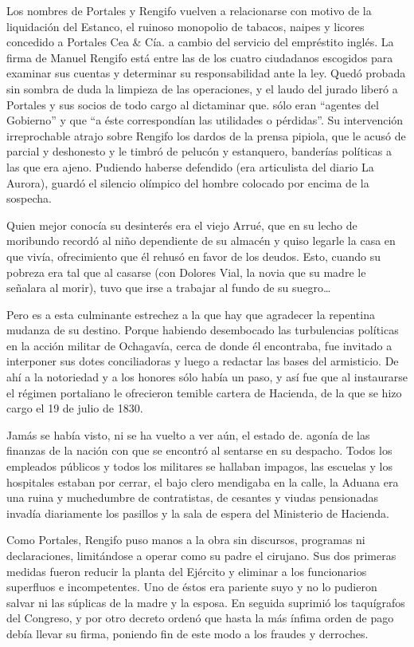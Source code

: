 \documentclass[10pt,twoside,openright]{memoir}
\begin{document}
Los nombres de Portales y Rengifo vuelven a relacionarse con motivo de
la liquidación del Estanco, el ruinoso monopolio de tabacos, naipes y
licores concedido a Portales Cea \& Cía. a cambio del servicio del
empréstito inglés. La firma de Manuel Rengifo está entre las de los
cuatro ciudadanos escogidos para examinar sus cuentas y determinar su
responsabilidad ante la ley. Quedó probada sin sombra de duda la
limpieza de las operaciones, y el laudo del jurado liberó a Portales y
sus socios de todo cargo al dictaminar que. sólo eran ``agentes del
Gobierno'' y que ``a éste correspondían las utilidades o pérdidas''. Su
intervención irreprochable atrajo sobre Rengifo los dardos de la prensa
pipiola, que le acusó de parcial y deshonesto y le timbró de pelucón y
estanquero, banderías políticas a las que era ajeno. Pudiendo haberse
defendido (era articulista del diario La Aurora), guardó el silencio
olímpico del hombre colocado por encima de la sospecha.

Quien mejor conocía su desinterés era el viejo Arrué, que en su lecho de
moribundo recordó al niño dependiente de su almacén y quiso legarle la
casa en que vivía, ofrecimiento que él rehusó en favor de los deudos.
Esto, cuando su pobreza era tal que al casarse (con Dolores Vial, la
novia que su madre le señalara al morir), tuvo que irse a trabajar al
fundo de su suegro\ldots

Pero es a esta culminante estrechez a la que hay que agradecer la
repentina mudanza de su destino. Porque habiendo desembocado las
turbulencias políticas en la acción militar de Ochagavía, cerca de donde
él encontraba, fue invitado a interponer sus dotes conciliadoras y luego
a redactar las bases del armisticio. De ahí a la notoriedad y a los
honores sólo había un paso, y así fue que al instaurarse el régimen
portaliano le ofrecieron temible cartera de Hacienda, de la que se hizo
cargo el 19 de julio de 1830.

Jamás se había visto, ni se ha vuelto a ver aún, el estado de. agonía de
las finanzas de la nación con que se encontró al sentarse en su
despacho. Todos los empleados públicos y todos los militares se hallaban
impagos, las escuelas y los hospitales estaban por cerrar, el bajo clero
mendigaba en la calle, la Aduana era una ruina y muchedumbre de
contratistas, de cesantes y viudas pensionadas invadía diariamente los
pasillos y la sala de espera del Ministerio de Hacienda.

Como Portales, Rengifo puso manos a la obra sin discursos, programas ni
declaraciones, limitándose a operar como su padre el cirujano. Sus dos
primeras medidas fueron reducir la planta del Ejército y eliminar a los
funcionarios superfluos e incompetentes. Uno de éstos era pariente suyo
y no lo pudieron salvar ni las súplicas de la madre y la esposa. En
seguida suprimió los taquígrafos del Congreso, y por otro decreto ordenó
que hasta la más ínfima orden de pago debía llevar su firma, poniendo
fin de este modo a los fraudes y derroches.
\end{document}
